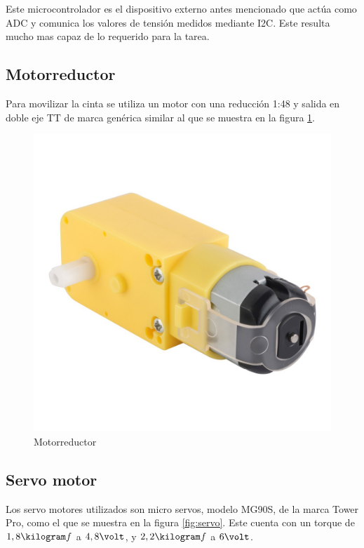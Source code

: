 \documentclass[12pt,letterpaper]{article}     %
\begin{document}
Este microcontrolador es el dispositivo externo antes mencionado que actúa como ADC y comunica los
valores de tensión medidos mediante I2C. Este resulta mucho mas capaz de lo requerido para la tarea.

\subsection{Motorreductor}

Para movilizar la cinta se utiliza un motor con una reducción 1:48 y salida en doble eje TT de marca
genérica similar al que se muestra en la figura \ref{fig:motor}.

\begin{figure}[!ht]
\centering
\includegraphics[scale=0.25]{imagenes/motorreductor.jpg}
\caption{Motorreductor}
\label{fig:motor}
\end{figure}

\subsection{Servo motor}

Los servo motores utilizados son micro servos, modelo MG90S, de la marca Tower Pro, como el que
se muestra en la figura \ref{fig:servo}. Este cuenta con un torque de $1,8\kilogram f$ a $4,8\volt$,
y $2,2\kilogram f$ a $6\volt$.
\end{document}
